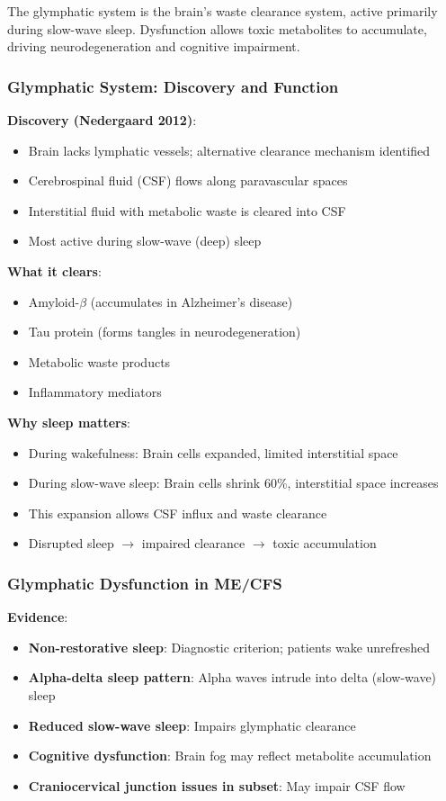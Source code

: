 The glymphatic system is the brain's waste clearance system, active primarily during slow-wave sleep. Dysfunction allows toxic metabolites to accumulate, driving neurodegeneration and cognitive impairment.

\subsubsection{Glymphatic System: Discovery and Function}

\textbf{Discovery (Nedergaard 2012)}:
\begin{itemize}
    \item Brain lacks lymphatic vessels; alternative clearance mechanism identified
    \item Cerebrospinal fluid (CSF) flows along paravascular spaces
    \item Interstitial fluid with metabolic waste is cleared into CSF
    \item Most active during slow-wave (deep) sleep
\end{itemize}

\textbf{What it clears}:
\begin{itemize}
    \item Amyloid-$\beta$ (accumulates in Alzheimer's disease)
    \item Tau protein (forms tangles in neurodegeneration)
    \item Metabolic waste products
    \item Inflammatory mediators
\end{itemize}

\textbf{Why sleep matters}:
\begin{itemize}
    \item During wakefulness: Brain cells expanded, limited interstitial space
    \item During slow-wave sleep: Brain cells shrink 60\%, interstitial space increases
    \item This expansion allows CSF influx and waste clearance
    \item Disrupted sleep $\rightarrow$ impaired clearance $\rightarrow$ toxic accumulation
\end{itemize}

\subsubsection{Glymphatic Dysfunction in ME/CFS}

\textbf{Evidence}:
\begin{itemize}
    \item \textbf{Non-restorative sleep}: Diagnostic criterion; patients wake unrefreshed
    \item \textbf{Alpha-delta sleep pattern}: Alpha waves intrude into delta (slow-wave) sleep
    \item \textbf{Reduced slow-wave sleep}: Impairs glymphatic clearance
    \item \textbf{Cognitive dysfunction}: Brain fog may reflect metabolite accumulation
    \item \textbf{Craniocervical junction issues in subset}: May impair CSF flow
\end{itemize}

